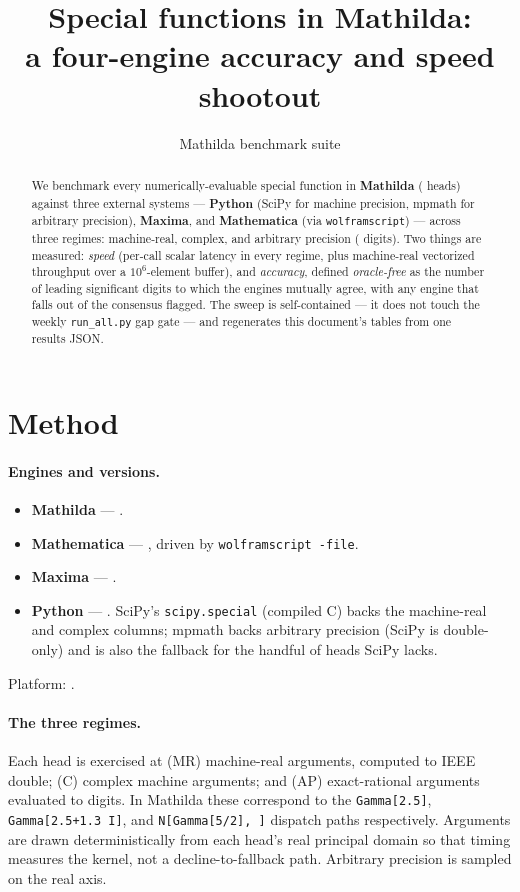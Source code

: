 \documentclass[11pt]{article}
\title{\textbf{Special functions in Mathilda:\\a four-engine accuracy and speed shootout}}
\author{Mathilda benchmark suite}
\date{\sfdate}
\newcommand{\mcode}[1]{\texttt{\textcolor{mCode}{#1}}}
\begin{document}
\maketitle

\begin{abstract}
\noindent
We benchmark every numerically-evaluable special function in \textbf{Mathilda}
(\sfncases{} heads) against three external systems --- \textbf{Python} (SciPy for machine
precision, mpmath for arbitrary precision), \textbf{Maxima}, and \textbf{Mathematica}
(via \mcode{wolframscript}) --- across three regimes: machine-real, complex, and
arbitrary precision (\sfapdps{} digits). Two things are measured: \emph{speed} (per-call
scalar latency in every regime, plus machine-real vectorized throughput over a
$10^6$-element buffer), and \emph{accuracy}, defined \emph{oracle-free} as the number of
leading significant digits to which the engines mutually agree, with any engine that
falls out of the consensus flagged. The sweep is self-contained --- it does not touch the
weekly \mcode{run\_all.py} gap gate --- and regenerates this document's tables from one
results JSON.
\end{abstract}

\section{Method}

\paragraph{Engines and versions.}
\begin{itemize}\itemsep1pt
  \item \textbf{Mathilda} --- \sfmathilda{}.
  \item \textbf{Mathematica} --- \sfwolfram{}, driven by \mcode{wolframscript -file}.
  \item \textbf{Maxima} --- \sfmaxima{}.
  \item \textbf{Python} --- \sfpython{}. SciPy's \mcode{scipy.special} (compiled C) backs
        the machine-real and complex columns; mpmath backs arbitrary precision (SciPy is
        double-only) and is also the fallback for the handful of heads SciPy lacks.
\end{itemize}
Platform: \sfplatform{}.

\paragraph{The three regimes.}
Each head is exercised at (MR) machine-real arguments, computed to IEEE double;
(C) complex machine arguments; and (AP) exact-rational arguments evaluated to \sfapdps{}
digits. In Mathilda these correspond to the \mcode{Gamma[2.5]}, \mcode{Gamma[2.5+1.3 I]},
and \mcode{N[Gamma[5/2], \sfapdps]} dispatch paths respectively. Arguments are drawn
deterministically from each head's real principal domain so that timing measures the
kernel, not a decline-to-fallback path. Arbitrary precision is sampled on the real axis.
\end{document}
